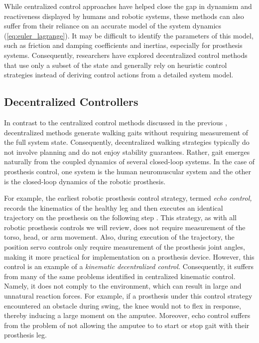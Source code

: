 While centralized control approaches have helped close the gap in dynamism and
reactiveness displayed by humans and robotic systems, these methods can also
suffer from their reliance on an accurate model of the system dynamics
(\cref{eq:euler_lagrange}). It may be difficult to identify the parameters of
this model, such as friction and damping coefficients and inertias, especially
for prosthesis systems. Consequently, researchers have explored decentralized
control methods that use only a subset of the state and generally rely on
heuristic control strategies instead of deriving control actions from a detailed
system model. 

\subsection{Decentralized Controllers}\label{sec:back_decentralized_control} 
In contrast to the centralized control methods discussed in the previous
, decentralized methods generate walking
gaits without requiring measurement of the full system state. Consequently,
decentralized walking strategies typically do not involve
planning and do not enjoy stability guarantees. Rather,
gait emerges naturally from the coupled dynamics of several closed-loop systems.
In the case of prosthesis control, one system is the human neuromuscular
system and the other is the closed-loop dynamics of the robotic prosthesis.

For example, the earliest robotic prosthesis control strategy, termed \emph{echo
control,} records the kinematics of the healthy leg and then executes an
identical trajectory on the prosthesis on the following step
\citep{grimes1977feasibility, grimes1979active}. This strategy, as with all
robotic prosthesis controls we will review, does not require measurement of the
torso, head, or arm movement. Also, during execution of the trajectory, the
position servo controls only require measurement of the prosthesis joint angles,
making it more practical for implementation on a prosthesis device. However,
this control is an example of a \emph{kinematic decentralized control.}
Consequently, it suffers from many of the same problems identified in
centralized kinematic control. Namely, it does not comply to the environment,
which can result in large and unnatural reaction forces. For example, if a
prosthesis under this control strategy encountered an obstacle during swing, the
knee would not to flex in response, thereby inducing a large moment on the
amputee. Moreover, echo control suffers from the problem of not allowing the
amputee to to start or stop gait with their prosthesis leg.

